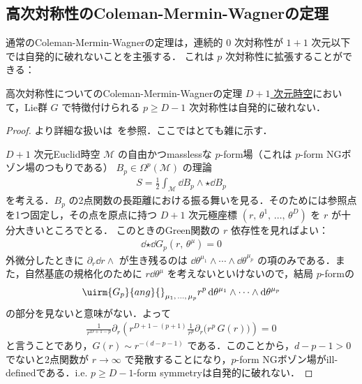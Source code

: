 \documentclass[TQFT_main]{subfiles}
\begin{document}
\subsection{高次対称性のColeman-Mermin-Wagnerの定理}

通常のColeman-Mermin-Wagnerの定理は，連続的 $0$ 次対称性が $1+1$ 次元以下では自発的に破れないことを主張する．
これは $p$ 次対称性に拡張することができる：

\begin{mytheo}[label=thm:pform-CMW]{高次対称性についてのColeman-Mermin-Wagnerの定理}
    \underline{$D+1$ 次元時空}において，Lie群 $G$ で特徴付けられる $p \ge D - 1$ 次対称性は自発的に破れない．
\end{mytheo}

\begin{proof}
    より詳細な扱いは~\cite[p.23]{Lake2018SSB}を参照．ここではとても雑に示す．

    $D+1$ 次元Euclid時空 $\mathcal{M}$ の自由かつmasslessな $p$-form場（これは $p$-form NGボゾン場のつもりである） $B_p \in \Omega^p(\mathcal{M})$ の理論
    \begin{align}
        S = \frac{1}{2} \int_{\mathcal{M}} \dd{B_p} \wedge \star \dd{B_p}
    \end{align}
    を考える．$B_p$ の2点関数の長距離における振る舞いを見る．そのためには参照点を1つ固定し，その点を原点に持つ $D+1$ 次元極座標 $(r,\, \theta^1,\, \dots,\, \theta^D)$ を $r$ が十分大きいところでとる．
    このときのGreen関数の $r$ 依存性を見ればよい：
    \begin{align}
        \dd{\star \dd{G_p (r,\, \theta^\mu)}} = 0
    \end{align}
    外微分したときに $\partial_r \dd{r} \wedge$ が生き残るのは $\dd{\theta^{\mu_1}} \wedge \cdots \wedge \dd{\theta^{\mu_p}}$ の項のみである．また，自然基底の規格化のために $r \dd{\theta^{\mu}}$ を考えないといけないので，結局 $p$-formの
    \begin{align}
        \uirm{G_p}{ang}{}_{\mu_1,\, \dots,\, \mu_p} r^p \dd{\theta^{\mu_1}} \wedge \cdots \wedge \dd{\theta^{\mu_p}}
    \end{align}
    の部分を見ないと意味がない．よって
    \begin{align}
        \frac{1}{r^{D+1-p}} \partial_r \left( r^{D+1-(p+1)} \frac{1}{r^{p}} \partial_r \bigl( r^p\, G(r) \bigr) \right) = 0
    \end{align}
    と言うことであり，$G(r) \sim r^{-(d-p-1)}$ である．このことから，$d-p-1 > 0$ でないと2点関数が $r \to \infty$ で発散することになり，$p$-form NGボゾン場がill-definedである．i.e. $p \ge D-1$-form symmetryは自発的に破れない．

\end{proof}
\end{document}
